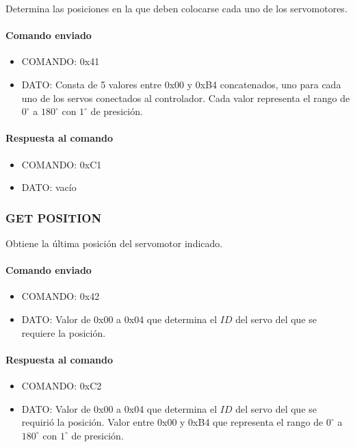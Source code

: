Determina las posiciones en la que deben colocarse cada uno de los servomotores.

\paragraph*{Comando enviado}

\begin{itemize}
	\item{COMANDO:} 0x41
	\item{DATO:} Consta de 5 valores entre 0x00 y 0xB4 concatenados, uno para cada uno de los servos conectados al controlador.
	Cada valor representa el rango de $0^{\circ}$ a $180^{\circ}$ con $1^{\circ}$ de presici\'on.
\end{itemize}

\paragraph*{Respuesta al comando}

\begin{itemize}
	\item{COMANDO:} 0xC1
	\item{DATO:} vac\'io
\end{itemize}

\subsubsection{GET POSITION}
\label{hA_protocolo_get_position}

Obtiene la \'ultima posici\'on del servomotor indicado.

\paragraph*{Comando enviado}

\begin{itemize}
	\item{COMANDO:} 0x42
	\item{DATO:} Valor de 0x00 a 0x04 que determina el $ID$ del servo del que se requiere la posici\'on.
\end{itemize}

\paragraph*{Respuesta al comando}

\begin{itemize}
	\item{COMANDO:} 0xC2
	\item{DATO:} Valor de 0x00 a 0x04 que determina el $ID$ del servo del que se requiri\'o la posici\'on.
	Valor entre 0x00 y 0xB4 que representa el rango de $0^{\circ}$ a $180^{\circ}$ con $1^{\circ}$ de presici\'on.
\end{itemize}

